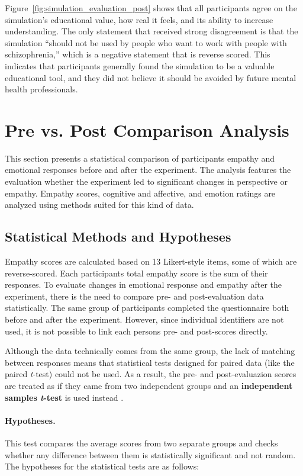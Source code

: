 Figure~\ref{fig:simulation_evaluation_post} shows that all participants agree on the simulation's educational value, how real it feels, and its ability to increase understanding. The only statement that received strong disagreement is that the simulation “should not be used by people who want to work with people with schizophrenia,” which is a negative statement that is reverse scored. This indicates that participants generally found the simulation to be a valuable educational tool, and they did not believe it should be avoided by future mental health professionals.

\section{Pre vs. Post Comparison Analysis}
\label{sec:pre_post_comparison}
This section presents a statistical comparison of participants empathy and emotional responses before and after the experiment. The analysis features the evaluation whether the experiment led to significant changes in perspective or empathy. Empathy scores, cognitive and affective, and emotion ratings are analyzed using methods suited for this kind of data.

\subsection{Statistical Methods and Hypotheses}

Empathy scores are calculated based on 13 Likert-style items, some of which are reverse-scored. Each participants total empathy score is the sum of their responses. To evaluate changes in emotional response and empathy after the experiment, there is the need to compare pre- and post-evaluation data statistically. The same group of participants completed the questionnaire both before and after the experiment. However, since individual identifiers are not used, it is not possible to link each persons pre- and post-scores directly.

Although the data technically comes from the same group, the lack of matching between responses means that statistical tests designed for paired data (like the paired \textit{t}-test) could not be used. As a result, the pre- and post-evaluazion scores are treated as if they came from two independent groups and an \textbf{independent samples \textit{t}-test} is used instead \cite{independentTtest}.

\paragraph{Hypotheses.} This test compares the average scores from two separate groups and checks whether any difference between them is statistically significant and not random. The hypotheses for the statistical tests are as follows:


